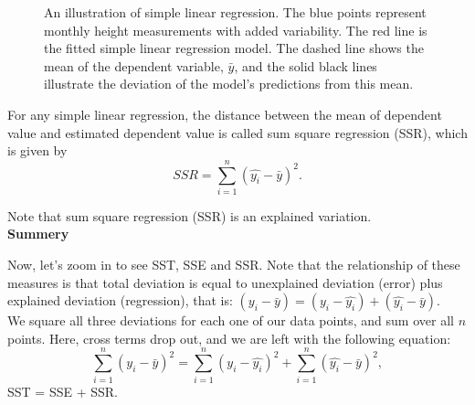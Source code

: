 \begin{figure}[H]
\centering
{}
\caption{An illustration of simple linear regression. The blue points represent monthly height measurements with added variability. The red line is the fitted simple linear regression model. The dashed line shows the mean of the dependent variable, $\bar{y}$, and the solid black lines illustrate the deviation of the model's predictions from this mean.}
\end{figure}

\begin{definition}
For any simple linear regression, the distance between the mean of dependent value and estimated dependent value is called sum square regression (SSR), which is given by $$SSR = \sum_{i=1}^{n}(\hat{y_i} - \bar{y})^2.$$
\end{definition}

Note that sum square regression (SSR) is an explained variation.\\

\textbf{Summery}

Now, let's zoom in to see SST, SSE and SSR. Note that the relationship of these measures is that total deviation is equal to unexplained deviation (error) plus explained deviation (regression), that is: $(y_i - \bar{y}) = (y_i - \hat{y_i}) + (\hat{y_i} - \bar{y})$.\\

We square all three deviations for each one of our data points, and sum over all $n$ points. Here, cross terms drop out, and we are left with the following equation: \[ \sum_{i=1}^{n}(y_i - \bar{y})^2 = \sum_{i=1}^{n} (y_i - \hat{y_i})^2 + \sum_{i=1}^{n}(\hat{y_i} - \bar{y})^2,\] SST = SSE + SSR.

